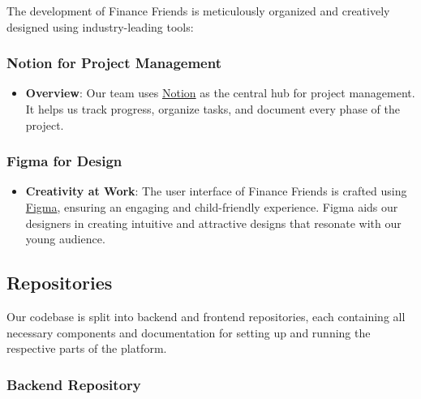 The development of Finance Friends is meticulously organized and
creatively designed using industry-leading tools:

\hypertarget{notion-for-project-management}{%
\subsubsection{Notion for Project
Management}\label{notion-for-project-management}}

\begin{itemize}
\tightlist
\item
  \textbf{Overview}: Our team uses
  \href{https://kvrancic.notion.site/Projekt-R-FINANCE-FRIEND-dcb6bebd85f348d3a2020f5d7a4dfdee?pvs=4}{Notion}
  as the central hub for project management. It helps us track progress,
  organize tasks, and document every phase of the project.
\end{itemize}

\hypertarget{figma-for-design}{%
\subsubsection{Figma for Design}\label{figma-for-design}}

\begin{itemize}
\tightlist
\item
  \textbf{Creativity at Work}: The user interface of Finance Friends is
  crafted using
  \href{https://www.figma.com/file/5AHqaEfYj0bNcMXTiKgUHE/Finance-Friends-UI?type=design\&node-id=0\%3A1\&mode=design\&t=lhfWHWlmmc4kGdFD-1}{Figma},
  ensuring an engaging and child-friendly experience. Figma aids our
  designers in creating intuitive and attractive designs that resonate
  with our young audience.
\end{itemize}

\hypertarget{repositories}{%
\subsection{Repositories}\label{repositories}}

Our codebase is split into backend and frontend repositories, each
containing all necessary components and documentation for setting up and
running the respective parts of the platform.

\hypertarget{backend-repository}{%
\subsubsection{Backend Repository}\label{backend-repository}}


